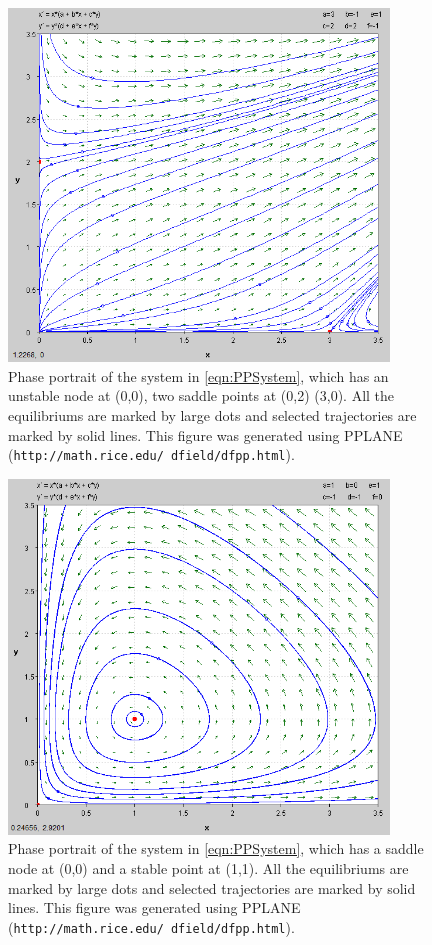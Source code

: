 \documentclass[a4paper,twocolumn]{article} %
\begin{document}
\begin{figure}[p] %
  \begin{center}
    \includegraphics[width = 0.9\textwidth, height = 0.5\textwidth]{21}
  \end{center}
  \caption{Phase portrait of the system in \eqref{eqn:PPSystem}, which has an unstable node at \mbox{(0,0)}, two saddle points at \mbox{(0,2)} \mbox{(3,0)}. All the equilibriums are marked by large dots and selected trajectories are marked by solid lines. This figure was generated using PPLANE (\texttt{http://math.rice.edu/~dfield/dfpp.html}).}
  \label{fig:pplane2}
\end{figure}

\begin{figure}[p] %
  \begin{center}
    \includegraphics[width = 0.9\textwidth, height = 0.5\textwidth]{p3}
  \end{center}
  \caption{Phase portrait of the system in \eqref{eqn:PPSystem}, which has a saddle node at \mbox{(0,0)} and a stable point at \mbox{(1,1)}. All the equilibriums are marked by large dots and selected trajectories are marked by solid lines. This figure was generated using PPLANE (\texttt{http://math.rice.edu/~dfield/dfpp.html}).}
  \label{fig:pplane2}
\end{figure}  
\end{document}
